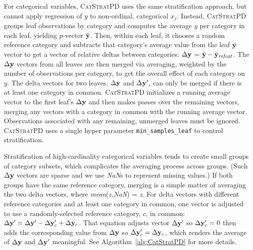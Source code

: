 \documentclass[smallextended]{svjour3}       %
\newcommand{\algref}[1]{Algorithm~\ref{#1}}
\newcommand{\cspd}{\fontfamily{cmr}\textsc{\small CatStratPD}}
\begin{document}
For categorical variables, \cspd{} uses the same stratification approach, but cannot apply  regression of $y$ to non-ordinal, categorical $x_j$. Instead, \cspd{} groups leaf observations by category and computes the average $y$ per category in each leaf, yielding $p$-vector $\bar{\bf y}$. Then,  within each leaf, it chooses a random reference category and subtracts that category's  average value from the leaf $\bar{\bf y}$ vector to get a vector of relative deltas between categories: $\Delta {\bf y}$ = $\bar{\bf y} - \bar{\bf y}_{\it refcat}$. The $\Delta  {\bf y}$ vectors from all leaves are then merged via averaging, weighted by the number of observations per category, to get the overall effect of each category on $y$.  The delta vectors for two leaves, $\Delta {\bf y}$ and $\Delta {\bf y}'$, can only be merged if there is at least one category in common.  \cspd{} initializes a running average vector to the first leaf's $\Delta  {\bf y}$ and then makes  passes over the remaining vectors, merging any vectors with a category in common with the running average vector.  Observations associated with any remaining, unmerged leaves must be ignored. \cspd{} uses a single hyper parameter {\tt\small min\_samples\_leaf} to control stratification. 

Stratification of high-cardinality categorical variables tends to create small groups of category subsets, which complicates the averaging process across groups. (Such $\Delta {\bf y}$ vectors are sparse and we use {\it NaN}s to represent missing values.) If both groups have the same reference category, merging is a simple matter of averaging the two delta vectors, where {\it mean}({\it z,NaN}) = {\it z}.  For delta vectors with different reference categories and at least one category in common, one vector is adjusted to use a randomly-selected reference category, $c$, in common: $\Delta {\bf y}' = \Delta {\bf y}' - \Delta {\bf y}_c' + \Delta {\bf y}_c$. That equation adjusts vector $\Delta {\bf y}'$ so $\Delta {\bf y}_c'=0$ then adds the corresponding value from $\Delta {\bf y}$ so $\Delta {\bf y}_c' = \Delta {\bf y}_c$, which renders the average of $\Delta {\bf y}$ and $\Delta {\bf y}'$ meaningful.  See \algref{alg:CatStratPD} for more details.
\end{document}
